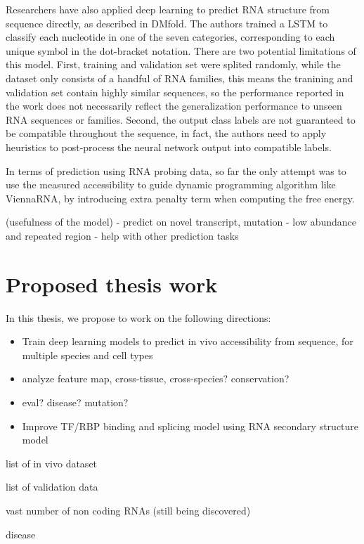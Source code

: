 \documentclass{proposal}
\begin{document}
Researchers have also applied deep learning to predict RNA structure from sequence directly, as described in DMfold\cite{wang2019dmfold}.
The authors trained a LSTM to classify each nucleotide in one of the seven categories,
corresponding to each unique symbol in the dot-bracket notation.
There are two potential limitations of this model.
First, training and validation set were splited randomly, while the dataset only consists of a handful of RNA families,
this means the tranining and validation set contain highly similar sequences,
so the performance reported in the work does not necessarily reflect the generalization performance to unseen RNA sequences or families.
Second, the output class labels are not guaranteed to be compatible throughout the sequence, in fact,
the authors need to apply heuristics to post-process the neural network output into compatible labels.

In terms of prediction using RNA probing data,
so far the only attempt was to use the measured accessibility to guide dynamic programming algorithm like ViennaRNA\cite{lorenz2011viennarna},
by introducing extra penalty term when computing the free energy.

(usefulness of the model)
- predict on novel transcript, mutation
- low abundance and repeated region
- help with other prediction tasks

\section{Proposed thesis work}

In this thesis, we propose to work on the following directions:

\begin{itemize}
    \item Train deep learning models to predict in vivo accessibility from sequence, for multiple species and cell types
    \item analyze feature map, cross-tissue, cross-species? conservation?
    \item eval? disease? mutation?
    \item Improve TF/RBP binding and splicing model using RNA secondary structure model
\end{itemize}

list of in vivo dataset

list of validation data


vast number of non coding RNAs (still being discovered)

disease
\end{document}
